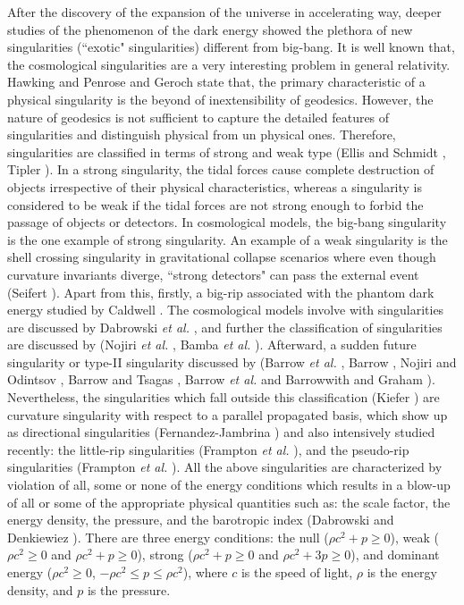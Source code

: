\documentclass[11pt]{article}
\theoremstyle{theorem}
\theoremstyle{defi}
\begin{document}
\par
After the discovery of the expansion of the universe in accelerating way, deeper studies of the phenomenon
 of the dark energy showed the plethora of new singularities (``exotic" singularities) different from big-bang. It is well known that, the cosmological singularities are
 a very interesting problem in general relativity. Hawking and Penrose \cite{15} and Geroch \cite{16} state that, the primary characteristic of a physical singularity is the
 beyond of inextensibility of geodesics. However, the nature of geodesics is not sufficient to capture the detailed features of singularities and
 distinguish physical from un physical ones. Therefore, singularities are classified in terms of strong and weak type (Ellis and Schmidt \cite{17}, Tipler \cite{18}). In a strong singularity, the tidal forces cause complete destruction of objects irrespective of their physical characteristics, whereas a singularity is considered to be weak if the tidal forces are not strong enough to forbid the passage of objects or detectors. In cosmological models, the big-bang singularity is the one example of strong singularity. An example of a weak singularity is the shell crossing singularity in gravitational collapse scenarios where even though curvature invariants diverge, ``strong detectors" can pass the external event (Seifert \cite{19}).
  Apart from this, firstly, a big-rip associated with the phantom dark energy studied by Caldwell \cite{20}. The cosmological models involve with singularities are discussed by Dabrowski \emph{et al.} \cite{21}, and further the classification of singularities are discussed by (Nojiri \emph{et al.} \cite{22}, Bamba \emph{et al.} \cite{23}). Afterward, a sudden
  future singularity or type-II singularity discussed by (Barrow \emph{et al.} \cite{R1}, Barrow \cite{24}, Nojiri and Odintsov \cite{25}, 
  Barrow and Tsagas \cite{R3}, Barrow \emph{et al.} \cite{R4} and Barrowwith and Graham \cite{R5}).  Nevertheless, the singularities which
  fall outside this classification (Kiefer \cite{26}) are curvature singularity with respect to a parallel propagated basis, which show up as directional singularities (Fernandez-Jambrina \cite{27})
  and also intensively studied recently: the little-rip singularities (Frampton \emph{et al.} \cite{28}), and the pseudo-rip singularities (Frampton \emph{et al.} \cite{29}). All the above singularities are
  characterized by violation of all, some or none of the energy conditions which results in a blow-up of all or some of the appropriate physical quantities
  such as: the scale factor, the energy density, the pressure, and the barotropic index (Dabrowski and Denkiewiez \cite{30}). There are three energy conditions: the null
  ($\rho c^2 + p\ge 0$), weak ($\rho c^2 \ge 0$ and $\rho c^2 + p \ge 0$), strong ($\rho c^2 + p\ge 0$ and $\rho c^2+3p\ge0$), and dominant
  energy ($\rho c^2\ge 0$, $-\rho c^2\le p\le\rho c^2$), where $c$ is the speed of light, $\rho$ is the energy density, and $p$ is the pressure.
  \par
\end{document}
